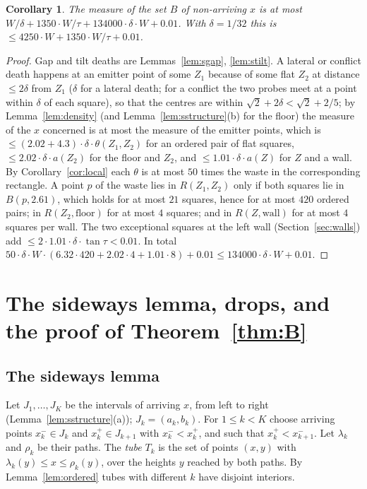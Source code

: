 \documentclass[11pt,letterpaper]{amsart}
\theoremstyle{plain}
\newtheorem{corollary}[theorem]{Corollary}
\theoremstyle{definition}
\theoremstyle{remark}
\begin{document}
\begin{corollary}\label{cor:deaths}
The measure of the set $B$ of non-arriving $x$ is at most $W/\delta+1350\cdot W/\tau+134000\cdot\delta\cdot W+0.01$. With $\delta=1/32$ this is $\le4250\cdot W+1350\cdot W/\tau+0.01$.
\end{corollary}
\begin{proof}
Gap and tilt deaths are Lemmas~\ref{lem:sgap}, \ref{lem:stilt}. A lateral or conflict death happens at an emitter point of some $Z_1$ because of some flat $Z_2$ at distance $\le2\delta$ from $Z_1$ ($\delta$ for a lateral death; for a conflict the two probes meet at a point within $\delta$ of each square), so that the centres are within $\sqrt2+2\delta<\sqrt2+2/5$; by Lemma~\ref{lem:density} (and Lemma~\ref{lem:sstructure}(b) for the floor) the measure of the $x$ concerned is at most the measure of the emitter points, which is $\le(2.02+4.3)\cdot\delta\cdot\theta(Z_1,Z_2)$ for an ordered pair of flat squares, $\le2.02\cdot\delta\cdot a(Z_2)$ for the floor and $Z_2$, and $\le1.01\cdot\delta\cdot a(Z)$ for $Z$ and a wall. By Corollary~\ref{cor:local} each $\theta$ is at most $50$ times the waste in the corresponding rectangle. A point $p$ of the waste lies in $R(Z_1,Z_2)$ only if both squares lie in $B(p,2.61)$, which holds for at most $21$ squares, hence for at most $420$ ordered pairs; in $R(Z_2,\text{floor})$ for at most $4$ squares; and in $R(Z,\text{wall})$ for at most $4$ squares per wall. The two exceptional squares at the left wall (Section~\ref{sec:walls}) add $\le2\cdot1.01\cdot\delta\cdot\tan\tau<0.01$. In total $50\cdot\delta\cdot W\cdot(6.32\cdot420+2.02\cdot4+1.01\cdot8)+0.01\le134000\cdot\delta\cdot W+0.01$.
\end{proof}

\section{The sideways lemma, drops, and the proof of Theorem~\ref{thm:B}}\label{sec:sideways}
\subsection{The sideways lemma}
Let $J_1,\ldots,J_K$ be the intervals of arriving $x$, from left to right (Lemma~\ref{lem:sstructure}(a)); $J_k=(a_k,b_k)$. For $1\le k<K$ choose arriving points $x_k^-\in J_k$ and $x_k^+\in J_{k+1}$ with $x_k^-<x_k^+$, and such that $x_k^+<x_{k+1}^-$. Let $\lambda_k$ and $\rho_k$ be their paths. The \emph{tube} $T_k$ is the set of points $(x,y)$ with $\lambda_k(y)\le x\le\rho_k(y)$, over the heights $y$ reached by both paths. By Lemma~\ref{lem:ordered} tubes with different $k$ have disjoint interiors.
\end{document}

